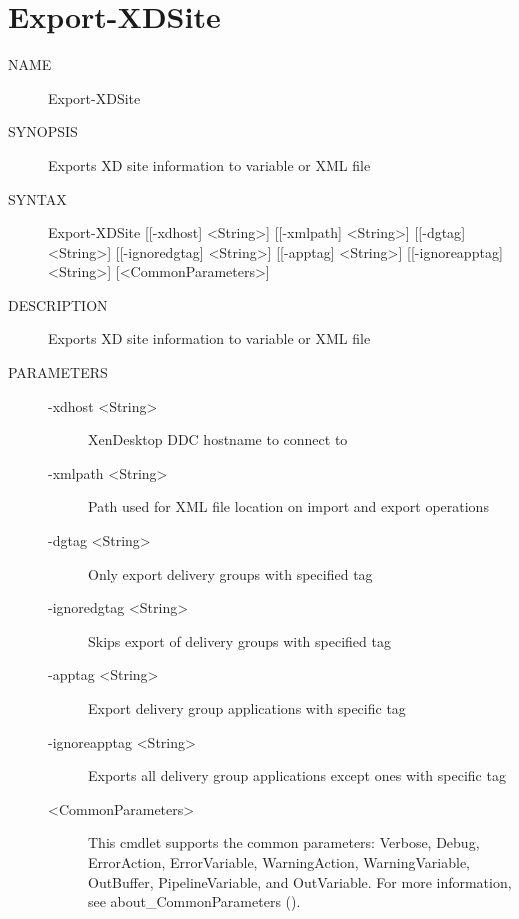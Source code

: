 \documentclass[letterpaper,10pt,english]{sphinxmanual}
\begin{document}
\section{Export-XDSite}
\label{\detokenize{cmd_export:export-xdsite}}\begin{description}
\item[{NAME}] \leavevmode
Export-XDSite

\item[{SYNOPSIS}] \leavevmode
Exports XD site information to variable or XML file

\item[{SYNTAX}] \leavevmode
Export-XDSite {[}{[}-xdhost{]} \textless{}String\textgreater{}{]} {[}{[}-xmlpath{]} \textless{}String\textgreater{}{]} {[}{[}-dgtag{]} \textless{}String\textgreater{}{]} {[}{[}-ignoredgtag{]} \textless{}String\textgreater{}{]} {[}{[}-apptag{]} \textless{}String\textgreater{}{]} {[}{[}-ignoreapptag{]} \textless{}String\textgreater{}{]} {[}\textless{}CommonParameters\textgreater{}{]}

\item[{DESCRIPTION}] \leavevmode
Exports XD site information to variable or XML file

\item[{PARAMETERS}] \leavevmode\begin{description}
\item[{-xdhost \textless{}String\textgreater{}}] \leavevmode
XenDesktop DDC hostname to connect to

\item[{-xmlpath \textless{}String\textgreater{}}] \leavevmode
Path used for XML file location on import and export operations

\item[{-dgtag \textless{}String\textgreater{}}] \leavevmode
Only export delivery groups with specified tag

\item[{-ignoredgtag \textless{}String\textgreater{}}] \leavevmode
Skips export of delivery groups with specified tag

\item[{-apptag \textless{}String\textgreater{}}] \leavevmode
Export delivery group applications with specific tag

\item[{-ignoreapptag \textless{}String\textgreater{}}] \leavevmode
Exports all delivery group applications except ones with specific tag

\item[{\textless{}CommonParameters\textgreater{}}] \leavevmode
This cmdlet supports the common parameters: Verbose, Debug,
ErrorAction, ErrorVariable, WarningAction, WarningVariable,
OutBuffer, PipelineVariable, and OutVariable. For more information, see
about\_CommonParameters ().


\end{description}
\end{description}
\end{document}
